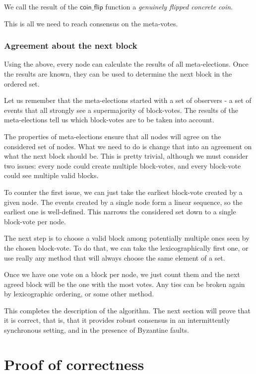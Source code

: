 \documentclass[a4paper,fleqn]{article}
\begin{document}
We call the result of the $\mathsf{coin\_flip}$ function a \emph{genuinely flipped concrete coin}.

This is all we need to reach consensus on the meta-votes.

\subsubsection{Agreement about the next block}

Using the above, every node can calculate the results of all meta-elections. Once the results are
known, they can be used to determine the next block in the ordered set.

Let us remember that the meta-elections started with a set of observers - a set of events that all
strongly see a supermajority of block-votes. The results of the meta-elections tell us which
block-votes are to be taken into account.

The properties of meta-elections ensure that all nodes will agree on the considered set of nodes.
What we need to do is change that into an agreement on what the next block should be. This is
pretty trivial, although we must consider two issues: every node could create multiple block-votes,
and every block-vote could see multiple valid blocks.

To counter the first issue, we can just take the earliest block-vote created by a given node. The
events created by a single node form a linear sequence, so the earliest one is well-defined. This
narrows the considered set down to a single block-vote per node.

The next step is to choose a valid block among potentially multiple ones seen by the chosen
block-vote. To do that, we can take the lexicographically first one, or use really any method that
will always choose the same element of a set.

Once we have one vote on a block per node, we just count them and the next agreed block will be the
one with the most votes. Any ties can be broken again by lexicographic ordering, or some other
method.

This completes the description of the algorithm. The next section will prove that it is correct,
that is, that it provides robust consensus in an intermittently synchronous setting, and in the
presence of Byzantine faults.

\section{Proof of correctness}
\end{document}
